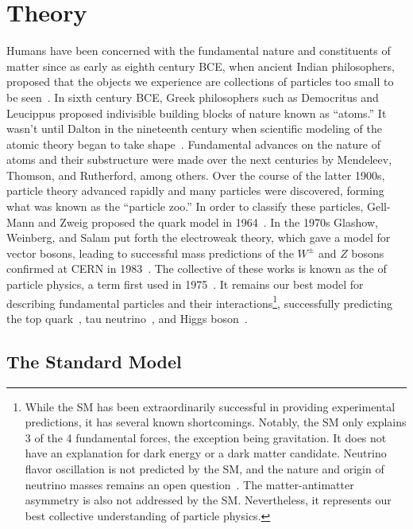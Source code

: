 \chapter{Theory}

    Humans have been concerned with the fundamental nature and constituents of matter since as early as eighth century BCE, when ancient Indian philosophers, proposed that the objects we experience are collections of particles too small to be seen~\cite{indian-atomism}. In sixth century BCE, Greek philosophers such as Democritus and Leucippus proposed indivisible building blocks of nature known as ``atoms.'' It wasn't until Dalton in the nineteenth century when scientific modeling of the atomic theory began to take shape~\cite{dalton}. Fundamental advances on the nature of atoms and their substructure were made over the next centuries by Mendeleev, Thomson, and Rutherford, among others. Over the course of the latter 1900s, particle theory advanced rapidly and many particles were discovered, forming what was known as the ``particle zoo.'' In order to classify these particles, Gell-Mann and Zweig proposed the quark model in 1964~\cite{quark-model}. In the 1970s Glashow, Weinberg, and Salam put forth the electroweak theory, which gave a model for vector bosons, leading to successful mass predictions of the $W^{\pm}$ and $Z$ bosons confirmed at \gls{CERN} in 1983~\cite{w-discovery, z-discovery}. The collective of these works is known as the  of particle physics, a term first used in 1975~\cite{conceptual-developments-text}. It remains our best model for describing fundamental particles and their interactions\footnote{While the \gls{SM} has been extraordinarily successful in providing experimental predictions, it has several known shortcomings. Notably, the \gls{SM} only explains 3 of the 4 fundamental forces, the exception being gravitation. It does not have an explanation for dark energy or a dark matter candidate. Neutrino flavor oscillation is not predicted by the \gls{SM}, and the nature and origin of neutrino masses remains an open question~\cite{neutrino-oscillation}. The matter-antimatter asymmetry is also not addressed by the \gls{SM}. Nevertheless, it represents our best collective understanding of particle physics.}, successfully predicting the top quark~\cite{top-quark}, tau neutrino~\cite{tau-neutrino}, and Higgs boson~\cite{higgs-discovery-atlas,higgs-discovery-cms}.
    

    \section{The Standard Model}

